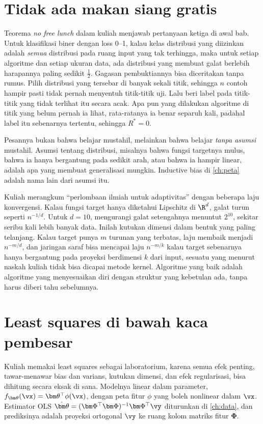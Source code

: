 \section{Tidak ada makan siang gratis}

Teorema \emph{no free lunch} dalam kuliah menjawab pertanyaan ketiga di awal bab. Untuk klasifikasi biner dengan loss 0--1, kalau
kelas distribusi yang diizinkan adalah \emph{semua} distribusi pada ruang input yang tak terhingga, maka untuk setiap algoritme dan
setiap ukuran data, ada distribusi yang membuat galat berlebih harapannya paling sedikit $\tfrac12$. Gagasan pembuktiannya bisa
diceritakan tanpa rumus. Pilih distribusi yang tersebar di banyak sekali titik, sehingga $n$ contoh hampir pasti tidak pernah
menyentuh titik-titik uji. Lalu beri label pada titik-titik yang tidak terlihat itu secara acak. Apa pun yang dilakukan algoritme di
titik yang belum pernah ia lihat, rata-ratanya ia benar separuh kali, padahal label itu sebenarnya tertentu, sehingga $R^*=0$.

Pesannya bukan bahwa belajar mustahil, melainkan bahwa belajar \emph{tanpa asumsi} mustahil. Asumsi tentang distribusi, misalnya
bahwa fungsi targetnya mulus, bahwa ia hanya bergantung pada sedikit arah, atau bahwa ia hampir linear, adalah apa yang membuat
generalisasi mungkin. Inductive bias di \cref{ch:peta} adalah nama lain dari asumsi itu.

Kuliah merangkum ``perlombaan ilmiah untuk adaptivitas'' dengan beberapa laju konvergensi. Kalau fungsi target hanya diketahui
Lipschitz di $\R^d$, galat turun seperti $n^{-1/d}$. Untuk $d=10$, mengurangi galat setengahnya menuntut $2^{10}$, sekitar seribu
kali lebih banyak data. Inilah kutukan dimensi dalam bentuk yang paling telanjang. Kalau target punya $m$ turunan yang terbatas,
laju membaik menjadi $n^{-m/d}$, dan jaringan saraf bisa mencapai laju $n^{-m/k}$ kalau target sebenarnya hanya bergantung pada
proyeksi berdimensi $k$ dari input, sesuatu yang menurut naskah kuliah tidak bisa dicapai metode kernel. Algoritme yang baik adalah
algoritme yang menyesuaikan diri dengan struktur yang kebetulan ada, tanpa harus diberi tahu sebelumnya.

\section{Least squares di bawah kaca pembesar}

Kuliah memakai least squares sebagai laboratorium, karena semua efek penting, tawar-menawar bias dan varians, kutukan dimensi, dan
efek regularisasi, bisa dihitung secara eksak di sana. Modelnya linear dalam parameter, $f_{\bm\theta}(\vx)=\bm\theta^\top\phi(\vx)$, dengan
peta fitur $\phi$ yang boleh nonlinear dalam $\vx$. Estimator OLS $\hat{\bm\theta}=(\bm\Phi^\top\bm\Phi)^{-1}\bm\Phi^\top\vy$ diturunkan di
\cref{ch:data}, dan prediksinya adalah proyeksi ortogonal $\vy$ ke ruang kolom matriks fitur $\bm\Phi$.

